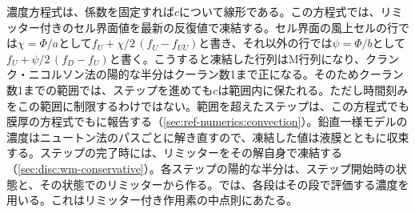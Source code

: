 濃度方程式は、係数を固定すれば$c$について線形である。この方程式では、リミッター付きのセル界面値を最新の反復値で凍結する。セル界面の風上セルの行では$\chi = \Phi/a$として$f_U + \chi/2\,(f_U - f_{UU})$と書き、それ以外の行では$\psi = \Phi/b$として$f_U + \psi/2\,(f_D - f_U)$と書く。こうすると凍結した行列はM行列になり、クランク・ニコルソン法の陽的な半分はクーラン数1まで正になる。そのためクーラン数1までの範囲では、ステップを進めても$c$は範囲内に保たれる。ただし時間刻みをこの範囲に制限するわけではない。範囲を超えたステップは、この方程式でも膜厚の方程式でもに報告する（\cref{sec:ref-numerics:convection}）。鉛直一様モデルの濃度はニュートン法のパスごとに解き直すので、凍結した値は液膜とともに収束する。ステップの完了時には、リミッターをその解自身で凍結する（\cref{sec:disc:wm-conservative}）。各ステップの陽的な半分は、ステップ開始時の状態と、その状態でのリミッターから作る。では、各段はその段で評価する濃度を用いる。これはリミッター付き作用素の中点則にあたる。

